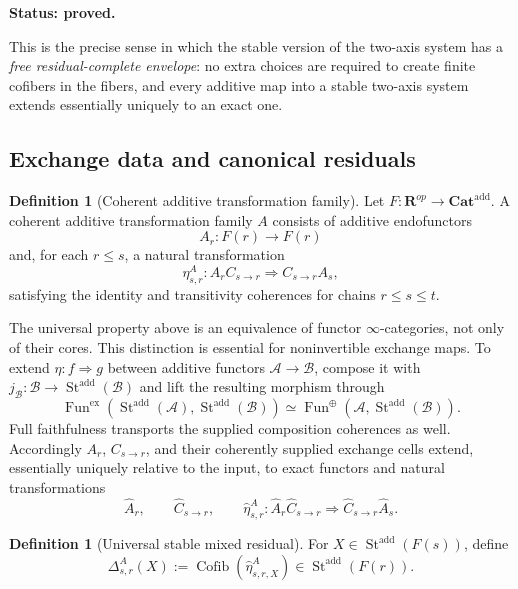\documentclass[11pt]{article}
\theoremstyle{definition}
\newtheorem{definition}[theorem]{Definition}
\theoremstyle{remark}
\newcommand{\Rcat}{\mathbf R}
\newcommand{\Cofib}{\operatorname{Cofib}}
\newcommand{\status}[1]{\textbf{Status: #1.}}
\begin{document}
\status{proved}

This is the precise sense in which the stable version of the two-axis system has a \emph{free residual-complete envelope}: no extra choices are required to create finite cofibers in the fibers, and every additive map into a stable two-axis system extends essentially uniquely to an exact one.

\subsection{Exchange data and canonical residuals}

\begin{definition}[Coherent additive transformation family]
Let $F:\Rcat^{op}\to\mathbf{Cat}^{\mathrm{add}}$. A coherent additive transformation family $A$ consists of additive endofunctors
\[
A_r:F(r)\to F(r)
\]
and, for each $r\le s$, a natural transformation
\[
\eta^A_{s,r}:A_rC_{s\to r}\Longrightarrow C_{s\to r}A_s,
\]
satisfying the identity and transitivity coherences for chains $r\le s\le t$.
\end{definition}

The universal property above is an equivalence of functor $\infty$-categories, not only of their cores. This distinction is essential for noninvertible exchange maps. To extend $\eta:f\Rightarrow g$ between additive functors $\mathcal A\to\mathcal B$, compose it with $j_{\mathcal B}:\mathcal B\to\operatorname{St}^{\mathrm{add}}(\mathcal B)$ and lift the resulting morphism through
\[
\operatorname{Fun}^{\mathrm{ex}}(\operatorname{St}^{\mathrm{add}}(\mathcal A),\operatorname{St}^{\mathrm{add}}(\mathcal B))
\simeq\operatorname{Fun}^{\oplus}(\mathcal A,\operatorname{St}^{\mathrm{add}}(\mathcal B)).
\]
Full faithfulness transports the supplied composition coherences as well. Accordingly $A_r$, $C_{s\to r}$, and their coherently supplied exchange cells extend, essentially uniquely relative to the input, to exact functors and natural transformations
\[
\widehat A_r,
\qquad
\widehat C_{s\to r},
\qquad
\widehat\eta^A_{s,r}:
\widehat A_r\widehat C_{s\to r}
\Longrightarrow
\widehat C_{s\to r}\widehat A_s.
\]

\begin{definition}[Universal stable mixed residual]\label{def:universal-residual}
For $X\in\operatorname{St}^{\mathrm{add}}(F(s))$, define
\[
\Delta^A_{s,r}(X)
:=
\Cofib\!\left(
\widehat\eta^A_{s,r,X}
\right)
\in
\operatorname{St}^{\mathrm{add}}(F(r)).
\]
\end{definition}
\end{document}
